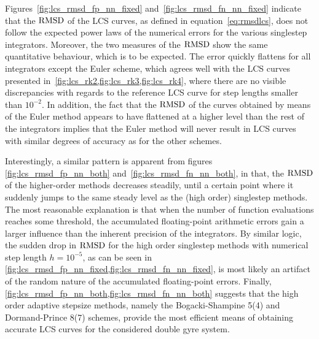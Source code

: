 Figures~\ref{fig:lcs_rmsd_fp_nn_fixed} and~\ref{fig:lcs_rmsd_fn_nn_fixed} indicate
that the $\operatorname{RMSD}$ of the LCS curves, as defined in equation~\eqref{eq:rmsdlcs},
does not follow the expected power laws of the numerical errors for the various
singlestep integrators. Moreover, the two measures of the $\operatorname{RMSD}$ show the
same quantitative behaviour, which is to be expected. The error quickly flattens
for all integrators except the Euler scheme, which agrees well with the LCS
curves presented in~\cref{fig:lcs_rk2,fig:lcs_rk3,fig:lcs_rk4},
where there are no visible discrepancies with regards to the reference LCS curve
for step lengths smaller than $10^{-2}$. In addition, the fact that the $\operatorname{RMSD}$
of the curves obtained by means of the Euler method appears to have flattened
at a higher level than the rest of the integrators implies that the Euler
method will never result in LCS curves with similar degrees of accuracy
as for the other schemes.









Interestingly, a similar pattern is apparent from figures
\ref{fig:lcs_rmsd_fp_nn_both} and~\ref{fig:lcs_rmsd_fn_nn_both}, in that, the
$\operatorname{RMSD}$ of the higher-order methods decreases steadily, until a certain point
where it suddenly jumps to the same steady level as the (high order) singlestep
methods. The most reasonable explanation is that when the number of function
evaluations reaches some threshold, the accumulated floating-point arithmetic
errors gain a larger influence than the inherent precision of the integrators.
By similar logic, the sudden drop in $\operatorname{RMSD}$ for the high order singlestep
methods with numerical step length $h=10^{-5}$, as can be seen in
\cref{fig:lcs_rmsd_fp_nn_fixed,fig:lcs_rmsd_fn_nn_fixed}, is most likely an
artifact of the random nature of the accumulated floating-point errors.
Finally, \cref{fig:lcs_rmsd_fp_nn_both,fig:lcs_rmsd_fn_nn_both} suggests that
the high order adaptive stepsize methods, namely the Bogacki-Shampine 5(4) and
Dormand-Prince 8(7) schemes, provide the most efficient means of obtaining
accurate LCS curves for the considered double gyre system.

